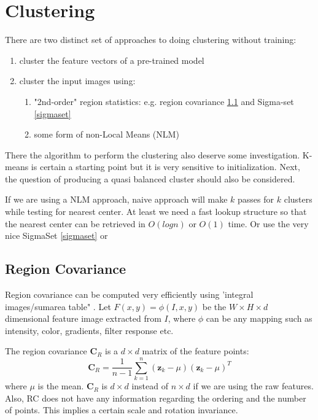 \newpage
\section{Clustering}
There are two distinct set of approaches to doing clustering without training:
\begin{enumerate}
\item cluster the feature vectors of a pre-trained model
\item cluster the input images using:
  \begin{enumerate}
   \item "2nd-order" region statistics: e.g. region covariance \ref{regcov} and Sigma-set \ref{sigmaset}
   \item some form of non-Local Means (NLM)
\end{enumerate}
\end{enumerate}

There the algorithm to perform the clustering also deserve some investigation.
K-means is certain a starting point but it is very sensitive to initialization.
Next, the question of producing a quasi balanced cluster should also be considered.

If we are using a NLM approach, naive approach will make $k$ passes for $k$ clusters
while testing for nearest center. At least we need a fast lookup structure so 
that the nearest center can be retrieved in $O(logn)$ or $O(1)$ time.
Or use the very nice SigmaSet \ref{sigmaset} or \cite{Kwatra2010}

\subsection{Region Covariance}\label{regcov}
Region covariance can be computed very efficiently using 'integral images/sumarea table" \cite{Porikli2006, Tuzel2006}. Let $F(x,y) = \phi(I,x,y)$ be the $W\times H\times d$ dimensional feature image extracted from $I$, where $\phi$ can be any mapping
such as intensity, color, gradients, filter response etc.

The region covariance $\mathbf{C}_R$ is a $d\times d$ matrix of the feature points:
\begin{equation}
 \mathbf{C}_R = \frac{1}{n-1}\sum\limits^n_{k=1}(\mathbf{z}_k - \mu) (\mathbf{z}_k - \mu)^T
\end{equation}
where $\mu$ is the mean. $\mathbf{C}_R$ is $d\times d$ instead of $n\times d$
if we are using the raw features. Also, RC does not have any information regarding
the ordering and the number of points. This implies a certain scale and rotation
invariance.

